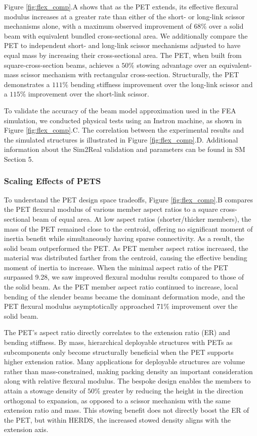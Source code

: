 {Figure \ref{fig:flex_comp}.A shows that as the PET extends, its effective flexural modulus increases at a greater rate than either of the short- or long-link scissor mechanisms alone, with a maximum observed improvement of $68\%$ over a solid beam with equivalent bundled cross-sectional area. We additionally compare the PET to independent short- and long-link scissor mechanisms adjusted to have equal mass by increasing their cross-sectional area. The PET, when built from square-cross-section beams, achieves a $50\%$ stowing advantage over an equivalent-mass scissor mechanism with rectangular cross-section. Structurally, the PET demonstrates a $111\%$ bending stiffness improvement over the long-link scissor and a $115\%$ improvement over the short-link scissor.} 

{To validate the accuracy of the beam model approximation used in the FEA simulation, we conducted physical tests using an Instron machine, as shown in Figure \ref{fig:flex_comp}.C. The correlation between the experimental results and the simulated structures is illustrated in Figure \ref{fig:flex_comp}.D. Additional information about the Sim2Real validation and parameters can be found in SM Section 5.}

\subsubsection{Scaling Effects of PETS} To understand the PET design space tradeoffs, Figure \ref{fig:flex_comp}.B compares the PET flexural modulus of various member aspect ratios to a square cross-sectional beam of equal area. At low aspect ratios (shorter/thicker members), the mass of the PET remained close to the centroid, offering no significant moment of inertia benefit while simultaneously having sparse connectivity. As a result, the solid beam outperformed the PET. As PET member aspect ratios increased, the material was distributed farther from the centroid, causing the effective bending moment of inertia to increase. When the minimal aspect ratio of the PET surpassed 9.28, we saw improved flexural modulus results compared to those of the solid beam. As the PET member aspect ratio continued to increase, local bending of the slender beams became the dominant deformation mode, and the PET flexural modulus asymptotically approached 71\% improvement over the solid beam. 

The PET's aspect ratio directly correlates to the extension ratio (ER) and bending stiffness. By mass, hierarchical deployable structures with PETs as subcomponents only become structurally beneficial when the PET supports higher extension ratios. Many applications for deployable structures are volume rather than mass-constrained, making packing density an important consideration along with relative flexural modulus. The bespoke design enables the members to attain a stowage density of $50\%$ greater by reducing the height in the direction orthogonal to expansion, as opposed to a scissor mechanism with the same extension ratio and mass. This stowing benefit does not directly boost the ER of the PET, but within HERDS, the increased stowed density aligns with the extension axis.

